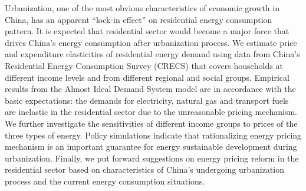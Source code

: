 Urbanization, one of the most obvious characteristics of economic growth in China, has an apparent “lock-in effect” on residential energy consumption pattern. It is expected that residential sector would become a major force that drives China's energy consumption after urbanization process. We estimate price and expenditure elasticities of residential energy demand using data from China's Residential Energy Consumption Survey (CRECS) that covers households at different income levels and from different regional and social groups. Empirical results from the Almost Ideal Demand System model are in accordance with the basic expectations: the demands for electricity, natural gas and transport fuels are inelastic in the residential sector due to the unreasonable pricing mechanism. We further investigate the sensitivities of different income groups to prices of the three types of energy. Policy simulations indicate that rationalizing energy pricing mechanism is an important guarantee for energy sustainable development during urbanization. Finally, we put forward suggestions on energy pricing reform in the residential sector based on characteristics of China's undergoing urbanization process and the current energy consumption situations.
